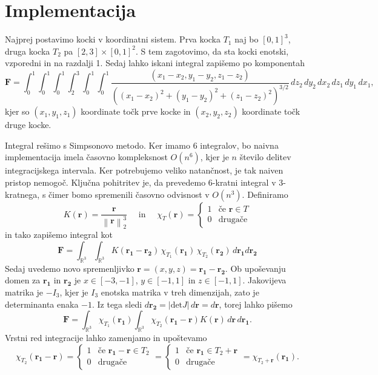 \documentclass[11pt, titlepage]{article}
\begin{document}
\section{Implementacija}
Najprej postavimo kocki v koordinatni sistem. Prva kocka $T_1$ naj bo $[0, 1]^3$, druga kocka $T_2$ pa $[2,3] \times [0,1]^2$. S tem zagotovimo, da sta kocki enotski, vzporedni in na razdalji 1. Sedaj lahko iskani integral zapišemo po komponentah
$$
\mathbf{F} = \int_{0}^{1} \int_{0}^{1} \int_{0}^{1} \int_{2}^{3} \int_{0}^{1} \int_{0}^{1} \frac{(x_1 - x_2, y_1 - y_2, z_1 - z_2)}{\left((x_1 - x_2)^2 + (y_1 - y_2)^2 + (z_1 - z_2)^2\right)^{3/2}} \, dz_2 \, dy_2 \, dx_2 \, dz_1 \, dy_1 \, dx_1,
$$
kjer so $(x_1, y_1, z_1)$ koordinate točk prve kocke in $(x_2, y_2, z_2)$ koordinate točk druge kocke.

Integral rešimo s Simpsonovo metodo. Ker imamo 6 integralov, bo naivna implementacija imela časovno kompleksnost $O(n^6)$, kjer je $n$ število delitev integracijskega intervala. Ker potrebujemo veliko natančnost, je tak naiven pristop nemogoč.
Ključna pohitritev je, da prevedemo 6-kratni integral v 3-kratnega, s čimer bomo spremenili časovno odvisnost v $O(n^3)$. Definiramo
$$
K(\mathbf{r}) = \frac{\mathbf{r}}{\left\lVert \mathbf{r} \right\rVert_2^3} 
\quad 
\text{ in } 
\quad 
\chi_T(\mathbf{r}) = \begin{cases}
    1 & \text{če } \mathbf{r} \in T \\
    0 & \text{drugače}
\end{cases}
$$
in tako zapišemo integral kot
$$
\mathbf{F} = \int_{\mathbb{R}^3} \int_{\mathbb{R}^3} K(\mathbf{r_1 - r_2}) \, \chi_{T_1}(\mathbf{r_1}) \, \chi_{T_2}(\mathbf{r_2}) \, d\mathbf{r_1}d\mathbf{r_2}
$$
Sedaj uvedemo novo spremenljivko $\mathbf{r} = (x,y,z) = \mathbf{r_1} - \mathbf{r_2}$. Ob upoševanju domen za $\mathbf{r_1}$ in $\mathbf{r_2}$ je $x \in [-3,-1]$, $y \in [-1,1]$ in $z \in [-1,1]$. Jakovijeva matrika je $-I_3$, kjer je $I_3$ enotska matrika v treh dimenzijah, zato je determinanta enaka $-1$. Iz tega sledi $d\mathbf{r_2} = |\text{det} J| \, d\mathbf{r} = d\mathbf{r}$, torej lahko pišemo
$$
\mathbf{F} = \int_{\mathbb{R}^3} \chi_{T_1}(\mathbf{r_1}) \int_{\mathbb{R}^3} \chi_{T_2}(\mathbf{r_1} - \mathbf{r}) K(\mathbf{r}) \, d\mathbf{r} \, d\mathbf{r_1}.
$$
Vrstni red integracije lahko zamenjamo in upoštevamo
$$
\chi_{T_2}(\mathbf{r_1} - \mathbf{r}) = 
\begin{cases}
    1 & \text{če } \mathbf{r_1} - \mathbf{r} \in T_2 \\
    0 & \text{drugače}
\end{cases}
=
\begin{cases}
    1 & \text{če } \mathbf{r_1} \in T_2 + \mathbf{r} \\
    0 & \text{drugače}
\end{cases}
=
\chi_{T_2 + \mathbf{r}}(\mathbf{r_1}).
$$
\end{document}
